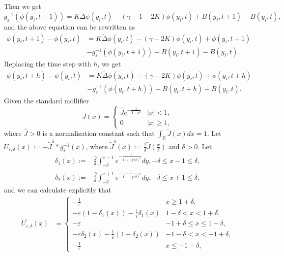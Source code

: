 \documentclass[11pt]{article}
\numberwithin{equation}{section}%
\numberwithin{figure}{section}%
\theoremstyle{remark}
\begin{document}
    Then we get 
	$$g^{-1}_{\varepsilon}(\phi(y_{i},t+1))=K\tilde{\Delta } \phi(y_{i},t)-(\gamma-1-2K)\phi(y_{i},t)+B(y_{i},t+1)-B(y_{i},t),$$
	and the above equation can be rewritten as
	\begin{align*}
		\phi(y_{i},t+1)-\phi(y_{i},t)&=K\tilde{\Delta } \phi(y_{i},t)-(\gamma-2K)\phi(y_{i},t)+\phi(y_{i},t+1)\\
		&-g^{-1}_{\varepsilon}(\phi(y_{i},t+1))+B(y_{i},t+1)-B(y_{i},t).
	\end{align*}
	Replacing the time step with $h$, we get
	\begin{align*}
		\phi(y_{i},t+h)-\phi(y_{i},t)&=K\tilde{\Delta } \phi(y_{i},t)-(\gamma-2K)\phi(y_{i},t)+\phi(y_{i},t+h)\\
		&-g^{-1}_{\varepsilon}(\phi(y_{i},t+h))+B(y_{i},t+h)-B(y_{i},t).
	\end{align*}
Given the standard mollifier
	\begin{equation*}
		\tilde{J}(x)=\left\{\begin{array}{ll}
			\hat{J} e^{-\frac{1}{1-x^{2}}} & |x|< 1,  \\
			0 & |x|\geq 1,
		\end{array}\right.
	\end{equation*}
	where $\hat{J}>0$ is a normalization constant such that $\int_{\mathbb{R}}\tilde{J}(x)dx=1$.
	Let $U_{\varepsilon,\delta}(x):=-\tilde{J}^{\delta}\ast g^{-1}_{\varepsilon}(x)$, where   $\tilde{J}^{\delta}(x):=\frac{1}{\delta}\tilde{J}(\frac{x}{\delta})$ and $\delta>0$. Let 
	\begin{align*}
			\delta_{1}(x):=&\frac{\hat{J}}{\delta}\int_{-\delta}^{x-1}e^{-\frac{1}{1-(y/\delta)^{2}}}dy, -\delta \leq x-1\leq \delta,\\
			\delta_{2}(x):=&\frac{\hat{J}}{\delta}\int_{-\delta}^{x+1}e^{-\frac{1}{1-(y/\delta)^{2}}}dy, -\delta \leq x+1\leq \delta,
	\end{align*}
	and we can calculate explicitly that 
	\begin{align*}
		U^{\prime}_{\varepsilon,\delta}(x)&=\left\{
		\begin{array}{ll}
			-\frac{1}{\varepsilon} &x\geq 1+\delta,\\
			 -\varepsilon(1-\delta_{1}(x))-\frac{1}{\varepsilon}\delta_{1}(x) &1-\delta <x< 1+\delta ,\\
			-\varepsilon &-1+\delta \leq x\leq  1-\delta ,\\
			-\varepsilon  \delta_{2}(x)-\frac{1}{\varepsilon}(1-\delta_{2}(x)) &-1-\delta <x< -1+\delta ,\\
			-\frac{1}{\varepsilon} &x\leq -1-\delta,
		\end{array}\right.
	\end{align*}
\end{document}
